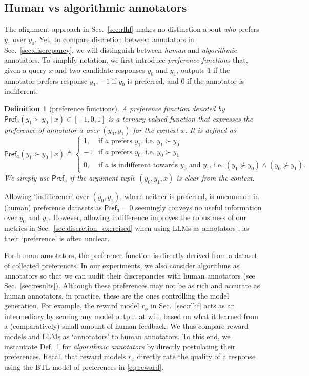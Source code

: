 \documentclass{article}
\newtheorem{definition}{Definition}
\newcommand{\pref}{\textsf{Pref}}
\begin{document}
\subsection{Human vs algorithmic annotators}\label{sec:annotator_fn}
The alignment approach in Sec.~\ref{sec:rlhf} makes no distinction about \textit{who} prefers $y_1$ over $y_0$. Yet, to compare discretion between annotators in Sec.~\ref{sec:discrepancy}, we will distinguish between \textit{human} and \textit{algorithmic} annotators. To simplify notation, we first introduce \textit{preference functions} that, given a query $x$ and two candidate responses $y_0$ and $y_1$, outputs $1$ if the annotator prefers response $y_1$, $-1$ if $y_0$ is preferred, and $0$ if the annotator is indifferent.
  
\begin{definition}[preference functions]\label{def:pref_fn}
A \textit{preference function} denoted by $\pref_a(y_1 \succ y_0 \mid x) \in [-1, 0, 1]$ is a ternary-valued function that expresses the preference of annotator $a$ over $(y_0, y_1)$ for the context $x$. It is defined as
\begin{equation}
\pref_a(y_1 \succ y_0 \mid x) \triangleq 
\begin{cases}
    1,& \text{if $a$ prefers $y_1$, i.e. $y_1 \succ y_0$}\\
    -1& \text{if $a$ prefers $y_0$, i.e. $y_0 \succ y_1$}\\
    0,& \text{if $a$ is indifferent towards $y_0$ and $y_1$, i.e. $(y_1 \not\succ y_0) \wedge (y_0 \not\succ y_1)$}.
\end{cases}
\end{equation}
We simply use $\pref_a$ if the argument tuple $(y_0, y_1, x)$ is clear from the context. 
\end{definition}

Allowing `indifference' over $(y_0, y_1)$, where neither is preferred, is uncommon in (human) preference datasets as $\pref_a = 0$ seemingly conveys no useful information over $y_0$ and $y_1$. However, allowing indifference improves the robustness of our metrics in Sec.~\ref{sec:discretion_exercised} when using LLMs as annotators \cite{zheng2023judging}, as their `preference' is often unclear.

For human annotators, the preference function is directly derived from a dataset of collected preferences. In our experiments, we also consider algorithms as annotators so that we can audit their discrepancies with human annotators (see Sec.~\ref{sec:results}). Although these preferences may not be as rich and accurate as human annotators, in practice, these are the ones controlling the model generation. For example, the reward model $r_{\phi}$ in Sec.~\ref{sec:rlhf} acts as an intermediary by scoring any model output at will, based on what it learned from a (comparatively) small amount of human feedback. We thus compare reward models and LLMs as `annotators' to human annotators. To this end, we instantiate Def.~\ref{def:pref_fn} for \textit{algorithmic annotators} by directly postulating their preferences. Recall that reward models $r_\phi$ directly rate the quality of a response using the BTL model of preferences in \eqref{eq:reward}.
\end{document}
